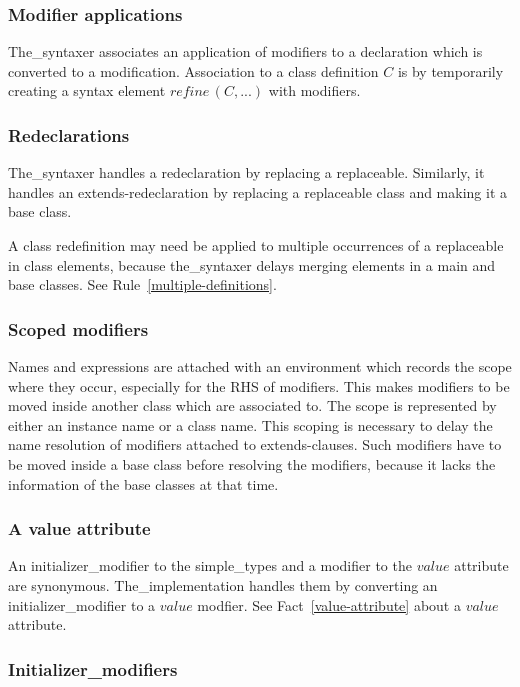 \documentclass[10pt,b5paper]{article}
\begin{document}
\subsubsection*{Modifier applications}

The_syntaxer associates an application of modifiers to a declaration
which is converted to a modification.  Association to a class
definition $C$ is by temporarily creating a syntax element
$\mathit{refine}\,(C, ...)$ with modifiers.

\subsubsection*{Redeclarations}

The_syntaxer handles a redeclaration by replacing a replaceable.
Similarly, it handles an extends-redeclaration by replacing a
replaceable class and making it a base class.

A class redefinition may need be applied to multiple occurrences of a
replaceable in class elements, because the_syntaxer delays merging
elements in a main and base classes.  See
Rule~\ref{multiple-definitions}.

\subsubsection*{Scoped modifiers}

Names and expressions are attached with an environment which records
the scope where they occur, especially for the RHS of modifiers.  This
makes modifiers to be moved inside another class which are associated
to.  The scope is represented by either an instance name or a class
name.  This scoping is necessary to delay the name resolution of
modifiers attached to extends-clauses.  Such modifiers have to be
moved inside a base class before resolving the modifiers, because it
lacks the information of the base classes at that time.

\subsubsection*{A value attribute}

An initializer_modifier to the simple_types and a modifier to the
$\mathit{value}$ attribute are synonymous.  The_implementation handles
them by converting an initializer_modifier to a $\mathit{value}$
modfier.  See Fact~\ref{value-attribute} about a $\mathit{value}$
attribute.

\subsubsection*{Initializer_modifiers}
\end{document}
